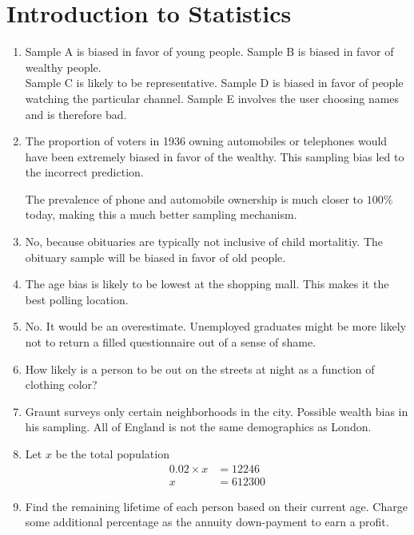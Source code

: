 \chapter{Introduction to Statistics}

\begin{enumerate}
	\item Sample A is biased in favor of young people. Sample B is biased in favor of wealthy people.  \\ Sample C is likely to be representative. Sample D is biased in favor of people watching the particular channel. Sample E involves the user choosing names and is therefore bad.
	
	\item The proportion of voters in 1936 owning automobiles or telephones would have been extremely biased in favor of the wealthy. This sampling bias led to the incorrect prediction.
	
	The prevalence of phone and automobile ownership is much closer to $ 100 \% $ today, making this a much better sampling mechanism. 
	
	\item No, because obituaries are typically not inclusive of child mortalitiy. The obituary sample will be biased in favor of old people.
	
	\item The age bias is likely to be lowest at the shopping mall. This makes it the best polling location.
	
	\item No. It would be an overestimate. Unemployed graduates might be more likely not to return a filled questionnaire out of a sense of shame. 
	
	\item How likely is a person to be out on the streets at night as a function of clothing color? 
	
	\item Graunt surveys only certain neighborhoods in the city. Possible wealth bias in his sampling. All of England is not the same demographics as London.
	
	\item Let $ x $ be the total population \\
	
	
		\begin{align}
			0.02 \times x &= 12246 \\
			x &= 612300
		\end{align}
	
	
	\item Find the remaining lifetime of each person based on their current age. Charge some additional percentage as the annuity down-payment to earn a profit.
	

\end{enumerate}
